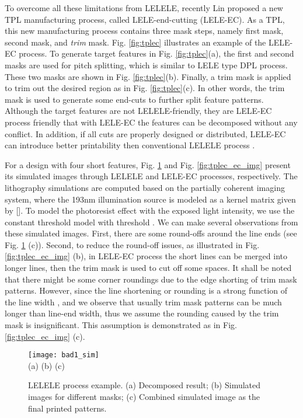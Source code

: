 \documentclass[12pt]{spieman}
\theoremstyle{plain}
\begin{document}
\begin{spacing}{1}
To overcome all these limitations from LELELE, recently Lin \cite{LITH_ISPD2012_Lin} proposed a new TPL manufacturing process, called LELE-end-cutting (LELE-EC).
As a TPL, this new manufacturing process contains three mask steps, namely first mask, second mask, and \textit{trim} mask.
Fig. \ref{fig:tplec} illustrates an example of the LELE-EC process.
To generate target features in Fig. \ref{fig:tplec}(a), the first and second masks are used for pitch splitting,
which is similar to LELE type DPL process.
These two masks are shown in Fig. \ref{fig:tplec}(b).
Finally, a trim mask is applied to trim out the desired region as in Fig. \ref{fig:tplec}(c).
In other words, the trim mask is used to generate some end-cuts to further split feature patterns.
Although the target features are not LELELE-friendly, they are LELE-EC process friendly that with LELE-EC the features can be decomposed without any conflict.
In addition, if all cuts are properly designed or distributed, LELE-EC can introduce better printability then conventional LELELE process \cite{LITH_ISPD2012_Lin}.

For a design with four short features, Fig. \ref{fig:tplec_le3_img} and Fig. \ref{fig:tplec_ec_img} present its simulated images through LELELE and LELE-EC processes, respectively.
The lithography simulations are computed based on the partially coherent imaging system, where the 193nm illumination source is modeled as a kernel matrix given by [].
To model the photoresist effect with the exposed light intensity, we use the constant threshold model with threshold .
We can make several observations from these simulated images.
First, there are some round-offs around the line ends (see Fig. \ref{fig:tplec_le3_img} (c)).
Second, to reduce the round-off issues, as illustrated in Fig. \ref{fig:tplec_ec_img} (b), in LELE-EC process the short lines can be merged into longer lines,
then the trim mask is used to cut off some spaces.
It shall be noted that there might be some corner roundings due to the edge shorting of trim mask patterns.
However, since the line shortening or rounding is a strong function of the line width \cite{LITH_Book08_Mack},
and we observe that usually trim mask patterns can be much longer than line-end width,
thus we assume the rounding caused by the trim mask is insignificant.
This assumption is demonstrated as in Fig. \ref{fig:tplec_ec_img} (c).

\begin{figure}[tb]
  \centering
  \texttt{[image: bad1\_sim]}
  \\ (a) \hspace{3.8cm} (b) \hspace{3.8cm} (c)
  \caption{LELELE process example.
  (a) Decomposed result;
  (b) Simulated images for different masks;
  (c) Combined simulated image as the final printed patterns.
  }
  \label{fig:tplec_le3_img}
\end{figure}


\end{spacing}
\end{document}
